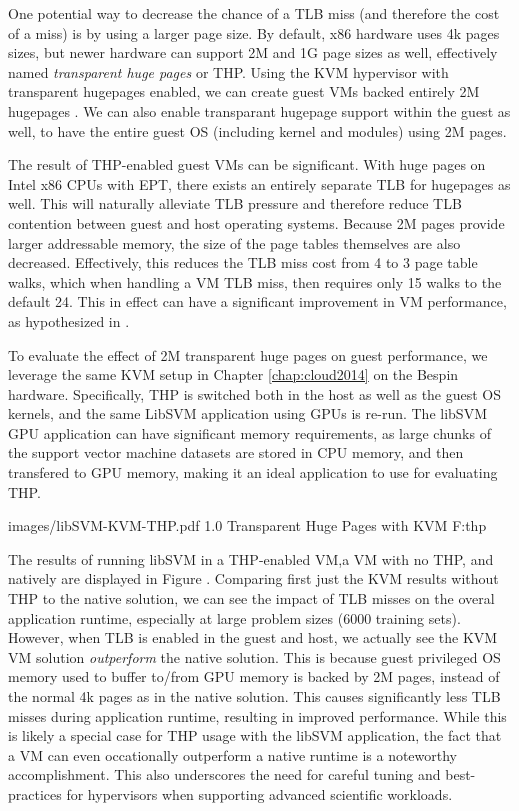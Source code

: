 One potential way to decrease the chance of a TLB miss (and therefore the cost of a miss) is by using a larger page size. By default, x86 hardware uses 4k pages sizes, but newer hardware can support 2M and 1G page sizes as well, effectively named \emph{transparent huge pages} or THP.  Using the KVM hypervisor with transparent hugepages enabled, we can create guest VMs backed entirely 2M hugepages \cite{redhat2010thp}. We can also enable transparant hugepage support within the guest as well, to have the entire guest OS (including kernel and modules) using 2M pages. 

The result of THP-enabled guest VMs can be significant. With huge pages on Intel x86 CPUs with EPT, there exists an entirely separate TLB for hugepages as well. This will naturally alleviate TLB pressure and therefore reduce TLB contention between guest and host operating systems. Because 2M pages provide larger addressable memory, the size of the page tables themselves are also decreased.  Effectively, this reduces the TLB miss cost from 4 to 3 page table walks, which when handling a VM TLB miss, then requires only 15 walks to the default 24. This in effect can have a significant improvement in VM performance, as hypothesized in \cite{redhat2010thp}.

To evaluate the effect of 2M transparent huge pages on guest performance, we leverage the same KVM setup in Chapter \ref{chap:cloud2014} on the Bespin hardware. Specifically, THP is switched both in the host as well as the guest OS kernels, and the same LibSVM application using GPUs is re-run. The libSVM GPU application can have significant memory requirements, as large chunks of the support vector machine datasets are stored in CPU memory, and then transfered to GPU memory, making it an ideal application to use for evaluating THP.



  {images/libSVM-KVM-THP.pdf}
  {1.0}
  {Transparent Huge Pages with KVM}
  {F:thp}


The results of running libSVM in a THP-enabled VM,a VM with no THP, and natively are displayed in Figure \cite{F:thp}.  Comparing first just the KVM results without THP to the native solution, we can see the impact of TLB misses on the overal application runtime, especially at large problem sizes (6000 training sets). However, when TLB is enabled in the guest and host, we actually see the KVM VM solution \emph{outperform} the native solution. This is because guest privileged OS memory used to buffer to/from GPU memory is backed by 2M pages, instead of the normal 4k pages as in the native solution. This causes significantly less TLB misses during application runtime, resulting in improved performance.  While this is likely a special case for THP usage with the libSVM application, the fact that a VM can even occationally outperform a native runtime is a noteworthy accomplishment. This also underscores the need for careful tuning and best-practices for hypervisors when supporting advanced scientific workloads. 

